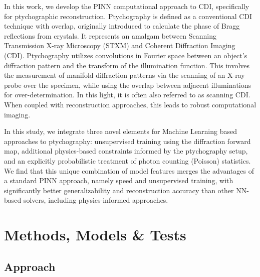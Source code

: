 \documentclass[sn-mathphys]{sn-jnl}%
\theoremstyle{thmstyleone}%
\theoremstyle{thmstyletwo}%
\theoremstyle{thmstylethree}%
\begin{document}
In this work, we develop the PINN computational approach to CDI, specifically for ptychographic reconstruction. Ptychography is defined as a conventional CDI technique with overlap, originally introduced to calculate the phase of Bragg reflections from crystals. It represents an amalgam between Scanning Transmission X-ray Microscopy (STXM) and Coherent Diffraction Imaging (CDI). Ptychography utilizes convolutions in Fourier space between an object's diffraction pattern and the transform of the illumination function. This involves the measurement of manifold diffraction patterns via the scanning of an X-ray probe over the specimen, while using the overlap between adjacent illuminations for over-determination. In this light, it is often also referred to as scanning CDI. When coupled with reconstruction approaches, this leads to robust computational imaging. 

In this study, we integrate three novel elements for Machine Learning based approaches to ptychography: unsupervised training using the diffraction forward map, additional physics-based constraints informed by the ptychography setup, and an explicitly probabilistic treatment of photon counting (Poisson) statistics. We find that this unique combination of model features merges the advantages of a standard PINN approach, namely speed and unsupervised training, with significantly better generalizability and reconstruction accuracy than other NN-based solvers, including physics-informed approaches.


\section{Methods, Models \& Tests}
\subsection{Approach}
\end{document}
